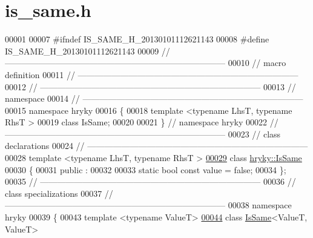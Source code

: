 \hypertarget{is__same_8h_source}{\section{is\-\_\-same.\-h}
}

\begin{DoxyCode}
00001 
00007 \textcolor{preprocessor}{#ifndef IS\_SAME\_H\_20130101112621143}
00008 \textcolor{preprocessor}{}\textcolor{preprocessor}{#define IS\_SAME\_H\_20130101112621143}
00009 \textcolor{preprocessor}{}\textcolor{comment}{//
      ------------------------------------------------------------------------------}
00010 \textcolor{comment}{// macro definition}
00011 \textcolor{comment}{//
      ------------------------------------------------------------------------------}
00012 \textcolor{comment}{//
      ------------------------------------------------------------------------------}
00013 \textcolor{comment}{// namespace}
00014 \textcolor{comment}{//
      ------------------------------------------------------------------------------}
00015 \textcolor{keyword}{namespace }hryky
00016 \{
00018     \textcolor{keyword}{template} <\textcolor{keyword}{typename} LhsT, \textcolor{keyword}{typename} RhsT >
00019     \textcolor{keyword}{class }IsSame;
00020 
00021 \} \textcolor{comment}{// namespace hryky}
00022 \textcolor{comment}{//
      ------------------------------------------------------------------------------}
00023 \textcolor{comment}{// class declarations}
00024 \textcolor{comment}{//
      ------------------------------------------------------------------------------}
00028 \textcolor{comment}{}\textcolor{keyword}{template} <\textcolor{keyword}{typename} LhsT, \textcolor{keyword}{typename} RhsT >
\hypertarget{is__same_8h_source_l00029}{}\hyperlink{classhryky_1_1_is_same}{00029} \textcolor{keyword}{class }\hyperlink{classhryky_1_1_is_same}{hryky::IsSame}
00030 \{
00031 \textcolor{keyword}{public} :
00032 
00033     \textcolor{keyword}{static} \textcolor{keywordtype}{bool} \textcolor{keyword}{const} value = \textcolor{keyword}{false};
00034 \};
00035 \textcolor{comment}{//
      ------------------------------------------------------------------------------}
00036 \textcolor{comment}{// class specializations}
00037 \textcolor{comment}{//
      ------------------------------------------------------------------------------}
00038 \textcolor{keyword}{namespace }hryky
00039 \{
00043 \textcolor{keyword}{template} <\textcolor{keyword}{typename} ValueT>
\hypertarget{is__same_8h_source_l00044}{}\hyperlink{classhryky_1_1_is_same_3_01_value_t_00_01_value_t_01_4}{00044} \textcolor{keyword}{class }\hyperlink{classhryky_1_1_is_same}{IsSame}<ValueT, ValueT>

\end{DoxyCode}
